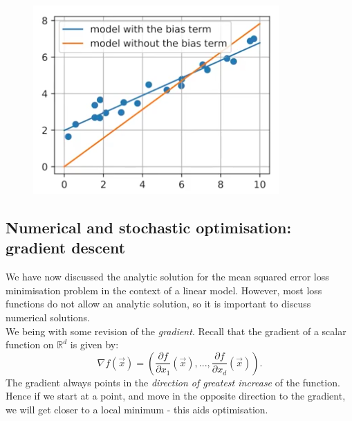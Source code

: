 \begin{figure}[H]
\centering
\includegraphics[scale=0.4]{biasterm.png}
\end{figure}





\newpage
\subsection{Numerical and stochastic optimisation: gradient descent}
We have now discussed the analytic solution for the mean squared error loss minimisation problem in the context of a linear model. However, most loss functions do not allow an analytic solution, so it is important to discuss numerical solutions.\\

We being with some revision of the \textit{gradient}. Recall that the gradient of a scalar function on $\mathbb{R}^d$ is given by:
\begin{equation*}
\nabla f(\vec{x}) = \left( \frac{\partial f}{\partial x_1}(\vec{x}), ..., \frac{\partial f}{\partial x_d}(\vec{x}) \right).
\end{equation*}
The gradient always points in the \textit{direction of greatest increase} of the function. Hence if we start at a point, and move in the opposite direction to the gradient, we will get closer to a local minimum - this aids optimisation.\\

